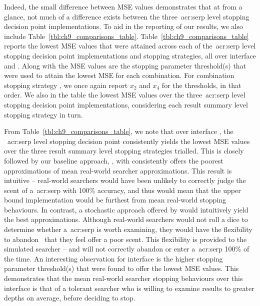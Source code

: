 Indeed, the small difference between MSE values demonstrates that at from a glance, not much of a difference exists between the three~\gls{acr:serp} level stopping decision point implementations. To aid in the reporting of our results, we also include Table~\ref{tbl:ch9_comparisons_table}. Table~\ref{tbl:ch9_comparisons_table} reports the lowest MSE values that were attained across each of the~\gls{acr:serp} level stopping decision point implementations and stopping strategies, all over interface  and . Along with the MSE values are the stopping parameter threshold(s) that were used to attain the lowest MSE for each combination. For combination stopping strategy , we once again report $x_2$ and $x_4$ for the thresholds, in that order. We also  in the table the lowest MSE values over the three~\gls{acr:serp} level stopping decision point implementations, considering each result summary level stopping strategy in turn.

From Table~\ref{tbl:ch9_comparisons_table}, we note that over interface , the ~\gls{acr:serp} level stopping decision point consistently yields the lowest MSE values over the three result summary level stopping strategies trialled. This is closely followed by our baseline approach, , with  consistently offers the poorest approximations of mean real-world searcher approximations. This result is intuitive -- real-world searchers would have been unlikely to correctly judge the scent of a~\gls{acr:serp} with 100\% accuracy, and thus would mean that the upper bound  implementation would be furthest from mean real-world stopping behaviours. In contrast, a stochastic approach offered by  would intuitively yield the best approximations. Although real-world searchers would not roll a dice to determine whether a~\gls{acr:serp} is worth examining, they would have the flexibility to abandon~ that they feel offer a poor scent. This flexibility is provided to the  simulated searcher -- and will not correctly abandon or enter a~\gls{acr:serp} 100\% of the time. An interesting observation for interface  is the higher stopping parameter threshold(s) that were found to offer the lowest MSE values. This demonstrates that the mean real-world searcher stopping behaviours over this interface is that of a tolerant searcher who is willing to examine results to greater depths on average, before deciding to stop.

